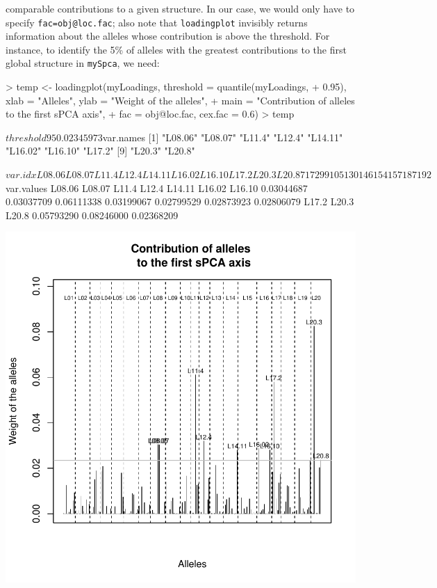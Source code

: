 \documentclass{article}
\begin{document}
comparable contributions to a given structure.
In our case, we would only have to specify \texttt{fac=obj@loc.fac};
also note that \texttt{loadingplot} invisibly returns information
about the alleles whose contribution is above the threshold.
For instance, to identify the 5\% of alleles with the greatest
contributions to the first global structure in \texttt{mySpca}, we need:
\begin{Schunk}
\begin{Sinput}
> temp <- loadingplot(myLoadings, threshold = quantile(myLoadings, 
+     0.95), xlab = "Alleles", ylab = "Weight of the alleles", 
+     main = "Contribution of alleles \n to the first sPCA axis", 
+     fac = obj@loc.fac, cex.fac = 0.6)
> temp
\end{Sinput}
\begin{Soutput}
$threshold
       95%
0.02345973 

$var.names
 [1] "L08.06" "L08.07" "L11.4"  "L12.4"  "L14.11" "L16.02" "L16.10" "L17.2" 
 [9] "L20.3"  "L20.8" 

$var.idx
L08.06 L08.07  L11.4  L12.4 L14.11 L16.02 L16.10  L17.2  L20.3  L20.8 
    71     72     99    105    130    146    154    157    187    192 

$var.values
    L08.06     L08.07      L11.4      L12.4     L14.11     L16.02     L16.10 
0.03044687 0.03037709 0.06111338 0.03199067 0.02799529 0.02873923 0.02806079 
     L17.2      L20.3      L20.8 
0.05793290 0.08246000 0.02368209 
\end{Soutput}
\end{Schunk}
\includegraphics{figs/spca-020}
\end{document}
